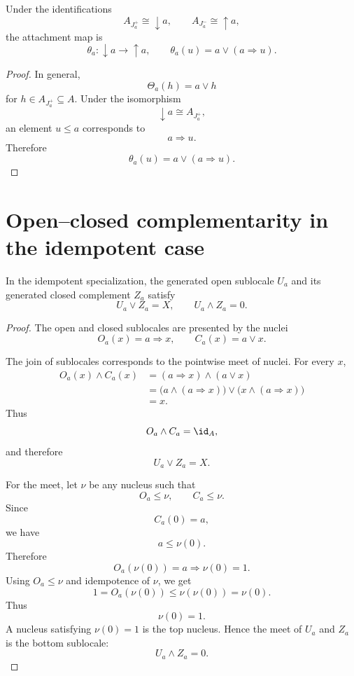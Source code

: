 \begin{proposition}
\label{prop:idempotent-attachment-formula}
Under the identifications
\[
    A_{J_a^+}\cong\downarrow a,
    \qquad
    A_{J_a^-}\cong\uparrow a,
\]
the attachment map is
\[
    \theta_a:\downarrow a\to\uparrow a,
    \qquad
    \theta_a(u)=a\vee(a\Rightarrow u).
\]
\end{proposition}

\begin{proof}
In general,
\[
    \Theta_a(h)=a\vee h
\]
for \(h\in A_{J_a^+}\subseteq A\).  Under the isomorphism
\[
    \downarrow a\cong A_{J_a^+},
\]
an element \(u\leq a\) corresponds to
\[
    a\Rightarrow u.
\]
Therefore
\[
    \theta_a(u)=a\vee(a\Rightarrow u).
\]
\end{proof}

\section{Open--closed complementarity in the idempotent case}
\label{sec:idempotent-open-closed-complementarity}

\begin{theorem}
\label{thm:idempotent-open-closed-complementary}
In the idempotent specialization, the generated open sublocale \(U_a\) and its
generated closed complement \(Z_a\) satisfy
\[
    U_a\vee Z_a=X,
    \qquad
    U_a\wedge Z_a=0.
\]
\end{theorem}

\begin{proof}
The open and closed sublocales are presented by the nuclei
\[
    O_a(x)=a\Rightarrow x,
    \qquad
    C_a(x)=a\vee x.
\]

The join of sublocales corresponds to the pointwise meet of nuclei.  For every
\(x\),
\[
\begin{aligned}
    O_a(x)\wedge C_a(x)
    &=
    (a\Rightarrow x)\wedge(a\vee x)\\
    &=
    \bigl(a\wedge(a\Rightarrow x)\bigr)
    \vee
    \bigl(x\wedge(a\Rightarrow x)\bigr)\\
    &=
    x.
\end{aligned}
\]
Thus
\[
    O_a\wedge C_a=\id_A,
\]
and therefore
\[
    U_a\vee Z_a=X.
\]

For the meet, let \(\nu\) be any nucleus such that
\[
    O_a\leq\nu,
    \qquad
    C_a\leq\nu.
\]
Since
\[
    C_a(0)=a,
\]
we have
\[
    a\leq\nu(0).
\]
Therefore
\[
    O_a(\nu(0))=a\Rightarrow\nu(0)=1.
\]
Using \(O_a\leq\nu\) and idempotence of \(\nu\), we get
\[
    1=O_a(\nu(0))\leq\nu(\nu(0))=\nu(0).
\]
Thus
\[
    \nu(0)=1.
\]
A nucleus satisfying \(\nu(0)=1\) is the top nucleus.  Hence the meet of
\(U_a\) and \(Z_a\) is the bottom sublocale:
\[
    U_a\wedge Z_a=0.
\]
\end{proof}


